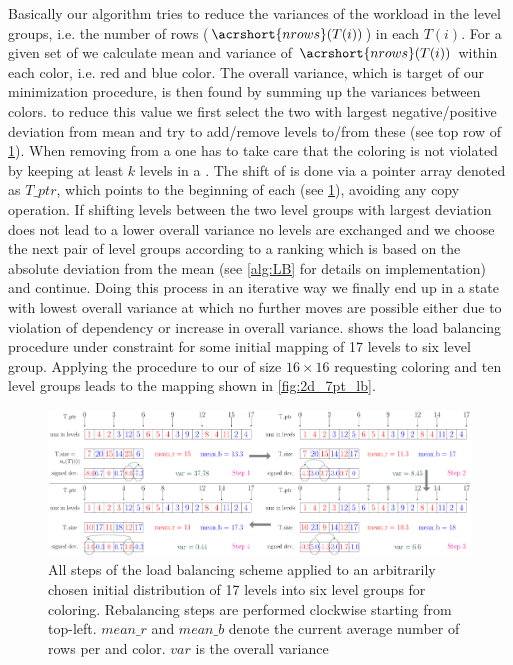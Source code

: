 Basically our algorithm tries to reduce the variances of the workload in the level groups, i.e. the number of rows ($\acrshort{nrows}(T(i))$) in each \levelGroup $T(i)$. For a given set of \levelGroups we calculate mean and variance of $\acrshort{nrows}(T(i))$ within each color, i.e. red and blue color.  
The overall variance, which is target of our minimization procedure, is then found by summing up the variances between colors. \Inorder to reduce this value we first select the two \levelGroups with largest negative/positive deviation from mean and try to add/remove levels to/from these \levelGroups (see top row of \cref{fig:lb_alg}). When removing \levels from a \levelGroup one has to take care that the \DK coloring is not violated by keeping at least $k$ levels in a \levelGroup. The shift of \levels is done via a pointer array denoted as $T\_ptr$, which points to the beginning of each \levelGroup (see \cref{fig:lb_alg}), avoiding any copy operation. If shifting levels between the two level groups with largest deviation does not lead to a lower overall variance no levels are exchanged and we choose the next pair of level groups according to a ranking which is based on the absolute deviation from the mean (see \cref{alg:LB} for details on implementation) and continue. Doing this process in an iterative way we finally end up in a state with lowest overall variance at which no further moves are possible either due to violation of \DK dependency or increase in overall variance.  shows the load balancing procedure under \DTWO constraint for some initial mapping of 17 levels to six level group. Applying the procedure to our  \stex of size $16 \times 16$  requesting \DTWO coloring and ten level groups leads to the mapping shown in \cref{fig:2d_7pt_lb}. 
  
   \begin{figure}[tbhp]
   	\centering
   	\includegraphics[height=0.22\textheight,width=\textwidth]{pics/load_balancing/lb_alg/lb_all}
   	\caption{All steps of the load balancing scheme applied to an arbitrarily chosen initial distribution of 17 levels into six level groups for \DTWO coloring. Rebalancing steps are performed clockwise starting from top-left. $mean\_r$ and $mean\_b$ denote the current average number of rows per \levelGroup and color. $var$ is the overall  variance}
   	\label{fig:lb_alg}
   \end{figure}
   
